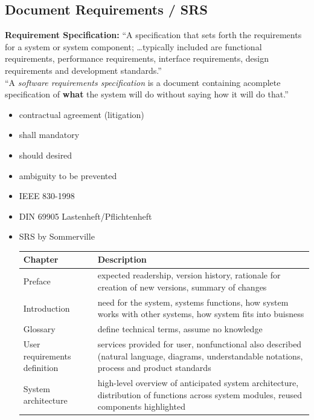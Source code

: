\documentclass[a4paper, 10pt]{article}
\begin{document}
\subsection{Document Requirements / SRS}
\begin{shaded}
\textbf{Requirement Specification:} ``A specification that sets forth the
requirements for a system or system component; \dots typically included
are functional requirements, performance requirements, interface
requirements, design requirements and development standards.'' \\
``A \emph{software requirements specification} is a document containing acomplete specification of \textbf{what} the system will do without saying how it will do that.''
\end{shaded}
\begin{itemize}
	\item contractual agreement (\follows litigation)
	\item shall \follows mandatory
	\item should \follows desired
	\item ambiguity \follows to be prevented
	\item IEEE 830-1998
	\item DIN 69905 Lastenheft/Pflichtenheft
	\item SRS by Sommerville \\
	\begin{tabular}{|p{3cm}|p{8cm}|}
	\hline %
	\textbf{Chapter} & \textbf{Description} \\
	\hline %
	Preface & expected readership, version history, rationale for creation of new versions, summary of changes \\
	\hline %
	Introduction & need for the system, systems functions, how system works with other systems, how system fits into buisness \\
	\hline %
	Glossary & define technical terms, assume no knowledge \\
	\hline %
	User requirements definition & services provided for user, nonfunctional also described (natural language, diagrams, understandable notations, process and product standards \\
	\hline %
	System architecture & high-level overview of anticipated system architecture, distribution of functions across system modules, reused components highlighted \\

\end{tabular}
\end{itemize}
\end{document}
